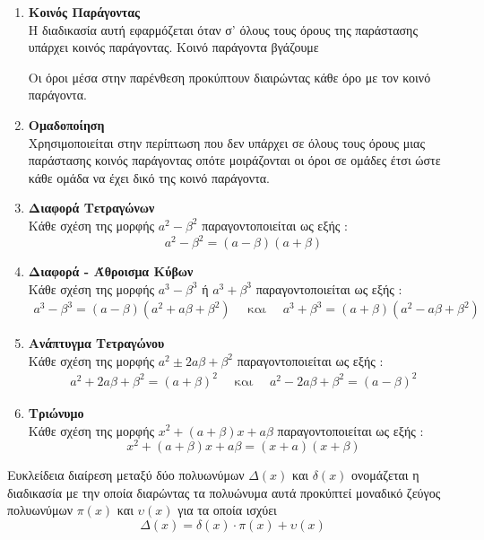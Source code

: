 \documentclass[twoside,nofonts,internet,shmeiwseis]{thewria}
\begin{document}
\begin{enumerate}[itemsep=0mm,label=\bf\arabic*.]
\item \textbf{Κοινός Παράγοντας}\\
Η διαδικασία αυτή εφαρμόζεται όταν σ' όλους τους όρους της παράστασης υπάρχει κοινός παράγοντας. Κοινό παράγοντα βγάζουμε 
Οι όροι μέσα στην παρένθεση προκύπτουν διαιρώντας κάθε όρο με τον κοινό παράγοντα.
\item \textbf{Ομαδοποίηση}\\
Χρησιμοποιείται στην περίπτωση που δεν υπάρχει σε όλους τους όρους μιας παράστασης κοινός παράγοντας οπότε μοιράζονται οι όροι σε ομάδες έτσι ώστε κάθε ομάδα να έχει δικό της κοινό παράγοντα.
\item \textbf{Διαφορά Τετραγώνων}\\
Κάθε σχέση της μορφής $ a^2-\beta^2 $ παραγοντοποιείται ως εξής : \[ a^2-\beta^2=(a-\beta)(a+\beta) \]
\item \textbf{Διαφορά - Άθροισμα Κύβων}\\
Κάθε σχέση της μορφής $ a^3-\beta^3 $ ή $ a^3+\beta^3 $ παραγοντοποιείται ως εξής : \begin{gather*}
a^3-\beta^3=(a-\beta)\left(a^2+a\beta+\beta^2 \right)\quad\textrm{ και }\quad
a^3+\beta^3=(a+\beta)\left(a^2-a\beta+\beta^2 \right)
\end{gather*}
\item \textbf{Ανάπτυγμα Τετραγώνου}\\
Κάθε σχέση της μορφής $ a^2\pm2a\beta+\beta^2 $ παραγοντοποιείται ως εξής :
\begin{gather*}
a^2+2a\beta+\beta^2=(a+\beta)^2\quad\textrm{ και }\quad
a^2-2a\beta+\beta^2=(a-\beta)^2
\end{gather*}
\item \textbf{Τριώνυμο}\\
Κάθε σχέση της μορφής $ x^2+(a+\beta)x+a\beta $ παραγοντοποιείται ως εξής : \[ x^2+(a+\beta)x+a\beta=(x+a)(x+\beta) \]
\end{enumerate}
Ευκλείδεια διαίρεση μεταξύ δύο πολυωνύμων $ \varDelta(x) $ και $ \delta(x) $ ονομάζεται η διαδικασία με την οποία διαρώντας τα πολυώνυμα αυτά προκύπτεί μοναδικό ζεύγος πολυωνύμων $ \pi(x) $ και $ \upsilon(x) $ για τα οποία ισχύει
\[ \varDelta(x)=\delta(x)\cdot\pi(x)+\upsilon(x) \]
\end{document}
